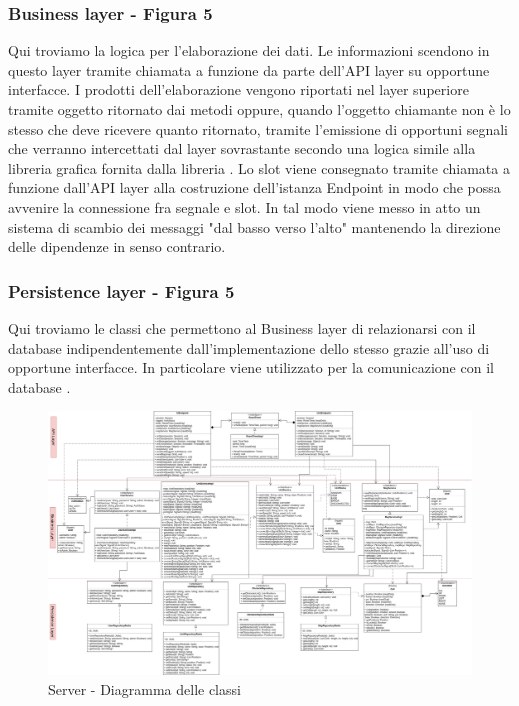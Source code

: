 	\subsubsection{Business layer - Figura 5}
		Qui troviamo la logica per l'elaborazione dei dati. Le informazioni scendono in questo layer tramite chiamata a funzione da parte dell'API layer su opportune interfacce. I prodotti dell'elaborazione vengono riportati nel layer superiore tramite oggetto ritornato dai metodi oppure, quando l'oggetto chiamante non è lo stesso che deve ricevere quanto ritornato, tramite l'emissione di opportuni segnali che verranno intercettati dal layer sovrastante secondo una logica  simile alla libreria grafica  fornita dalla libreria . Lo slot viene consegnato tramite chiamata a funzione dall'API layer alla costruzione dell'istanza Endpoint in modo che possa avvenire la connessione fra segnale e slot. In tal modo viene messo in atto un sistema di scambio dei messaggi "dal basso verso l'alto" mantenendo la direzione delle dipendenze in senso contrario.

	\subsubsection{Persistence layer - Figura 5}
		Qui troviamo le classi che permettono al Business layer di relazionarsi con il database indipendentemente dall'implementazione dello stesso grazie all'uso di opportune interfacce. In particolare  viene utilizzato per la comunicazione con il database .

		\begin{landscape}
			\begin{figure}[h!]
				\includegraphics[width=26cm]{img/server_classi.png}
				\caption{Server - Diagramma delle classi}
			\end{figure}
		\end{landscape}

